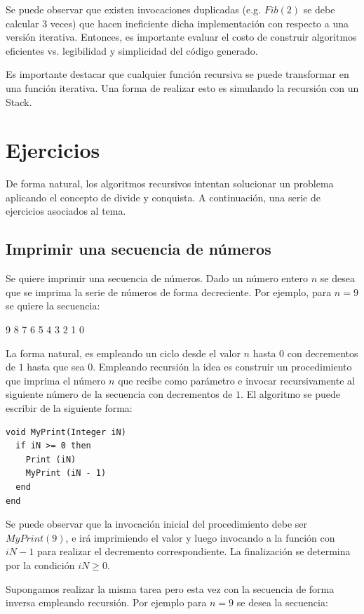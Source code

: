 Se puede observar que existen invocaciones duplicadas (e.g. $Fib(2)$ se debe calcular 3 veces) que hacen ineficiente dicha implementación con respecto a una versión iterativa. Entonces, es importante evaluar el costo de construir algoritmos eficientes vs. legibilidad y simplicidad del código generado.

Es importante destacar que cualquier función recursiva se puede transformar en una función iterativa. Una forma de realizar esto es simulando la recursión con un Stack.

\section{Ejercicios}

De forma natural, los algoritmos recursivos intentan solucionar un problema aplicando el concepto de divide y conquista. A continuación, una serie de ejercicios asociados al tema.

\subsection{Imprimir una secuencia de números}

Se quiere imprimir una secuencia de números. Dado un número entero $n$ se desea que se imprima la serie de números de forma decreciente. Por ejemplo, para $n=9$ se quiere la secuencia:

9 8 7 6 5 4 3 2 1 0

La forma natural, es empleando un ciclo desde el valor $n$ hasta $0$ con decrementos de $1$ hasta que sea $0$. Empleando recursión la idea es construir un procedimiento que imprima el número $n$ que recibe como parámetro e invocar recursivamente al siguiente número de la secuencia con decrementos de $1$. El algoritmo se puede escribir de la siguiente forma:

\begin{lstlisting}[upquote=true, language=pseudo]
void MyPrint(Integer iN)
  if iN >= 0 then
    Print (iN)
    MyPrint (iN - 1)
  end
end
\end{lstlisting}

Se puede observar que la invocación inicial del procedimiento debe ser $MyPrint(9)$, e irá imprimiendo el valor y luego invocando a la función con $iN-1$ para realizar el decremento correspondiente. La finalización se determina por la condición $iN \ge 0$.

Supongamos realizar la misma tarea pero esta vez con la secuencia de forma inversa empleando recursión. Por ejemplo para $n=9$ se desea la secuencia:

